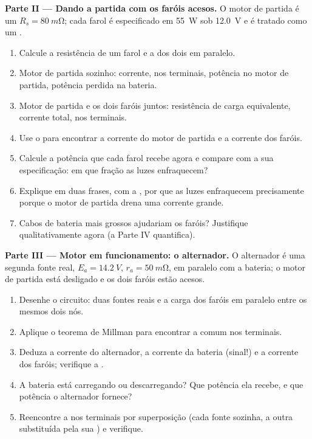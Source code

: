 \begin{problem}
\medskip
\noindent\textbf{Parte II --- Dando a partida com os faróis acesos.}
O motor de partida é um  $R_s = \qty{80}{m\ohm}$; cada farol é
especificado em \qty{55}{W} sob \qty{12.0}{V} e é tratado como um .
\begin{enumerate}[resume]
  \item Calcule a resistência de um farol e a dos dois em
        paralelo.
  \item Motor de partida sozinho: corrente,  nos terminais, potência no motor de partida,
        potência perdida na bateria.
  \item Motor de partida e os dois faróis juntos: resistência de carga
        equivalente, corrente total,  nos terminais.
  \item Use o  para encontrar a corrente do motor de partida e a
        corrente dos faróis.
  \item Calcule a potência que cada farol recebe agora e compare com
        a sua especificação: em que fração as luzes enfraquecem?
  \item Explique em duas frases, com a , por que as luzes
        enfraquecem precisamente porque o motor de partida drena uma corrente grande.
  \item Cabos de bateria mais grossos ajudariam os faróis? Justifique
        qualitativamente agora (a Parte IV quantifica).
\end{enumerate}

\medskip
\noindent\textbf{Parte III --- Motor em funcionamento: o alternador.}
O alternador é uma segunda fonte real, $E_a = \qty{14.2}{V}$,
$r_a = \qty{50}{m\ohm}$, em paralelo com a bateria; o motor de partida está
desligado e os dois faróis estão acesos.
\begin{enumerate}[resume]
  \item Desenhe o circuito: duas fontes reais e a carga dos faróis em
        paralelo entre os mesmos dois nós.
  \item Aplique o teorema de Millman para encontrar a  comum nos terminais.
  \item Deduza a corrente do alternador, a corrente da bateria (sinal!) e
        a corrente dos faróis; verifique a .
  \item A bateria está carregando ou descarregando? Que potência ela
        recebe, e que potência o alternador fornece?
  \item Reencontre a  nos terminais por superposição (cada fonte
        sozinha, a outra substituída pela sua ) e
        verifique.
\end{enumerate}


\end{problem}
